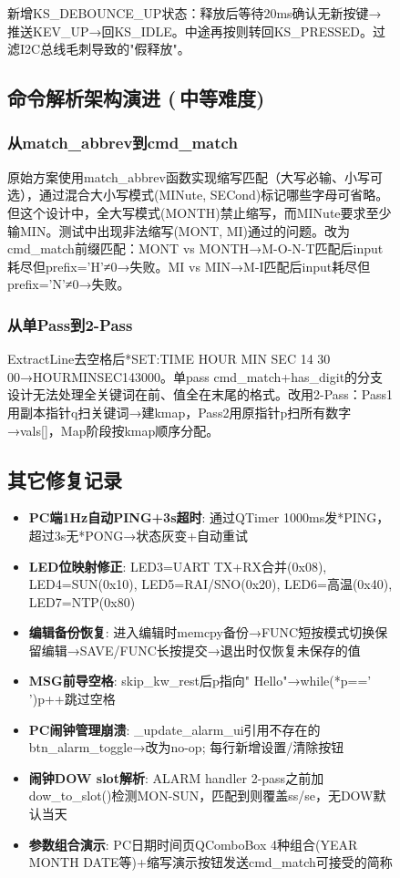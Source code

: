 \documentclass[12pt,hyperref,a4paper,UTF8]{ctexart}
\begin{document}
\begin{figure}[!htbp]
新增KS\_DEBOUNCE\_UP状态：释放后等待20ms确认无新按键→推送KEV\_UP→回KS\_IDLE。中途再按则转回KS\_PRESSED。过滤I2C总线毛刺导致的"假释放"。

\subsection{命令解析架构演进 \qquad (\faStar\,\faStar 中等难度)}

\subsubsection{从match\_abbrev到cmd\_match}

原始方案使用match\_abbrev函数实现缩写匹配（大写必输、小写可选），通过混合大小写模式(MINute, SECond)标记哪些字母可省略。但这个设计中，全大写模式(MONTH)禁止缩写，而MINute要求至少输MIN。测试中出现非法缩写(MONT, MI)通过的问题。改为cmd\_match前缀匹配：MONT vs MONTH→M-O-N-T匹配后input耗尽但prefix='H'≠0→失败。MI vs MIN→M-I匹配后input耗尽但prefix='N'≠0→失败。

\subsubsection{从单Pass到2-Pass}

ExtractLine去空格后*SET:TIME HOUR MIN SEC 14 30 00→HOURMINSEC143000。单pass cmd\_match+has\_digit的分支设计无法处理全关键词在前、值全在末尾的格式。改用2-Pass：Pass1用副本指针q扫关键词→建kmap，Pass2用原指针p扫所有数字→vals[]，Map阶段按kmap顺序分配。

\subsection{其它修复记录}

\begin{itemize}
    \item \textbf{PC端1Hz自动PING+3s超时}: 通过QTimer 1000ms发*PING，超过3s无*PONG→状态灰变+自动重试
    \item \textbf{LED位映射修正}: LED3=UART TX+RX合并(0x08), LED4=SUN(0x10), LED5=RAI/SNO(0x20), LED6=高温(0x40), LED7=NTP(0x80)
    \item \textbf{编辑备份恢复}: 进入编辑时memcpy备份→FUNC短按模式切换保留编辑→SAVE/FUNC长按提交→退出时仅恢复未保存的值
    \item \textbf{MSG前导空格}: skip\_kw\_rest后p指向" Hello"→while(*p==' ')p++跳过空格
    \item \textbf{PC闹钟管理崩溃}: \_update\_alarm\_ui引用不存在的btn\_alarm\_toggle→改为no-op; 每行新增设置/清除按钮
    \item \textbf{闹钟DOW slot解析}: ALARM handler 2-pass之前加dow\_to\_slot()检测MON-SUN，匹配到则覆盖ss/se，无DOW默认当天
    \item \textbf{参数组合演示}: PC日期时间页QComboBox 4种组合(YEAR MONTH DATE等)+缩写演示按钮发送cmd\_match可接受的简称
\end{itemize}


\end{figure}
\end{document}
